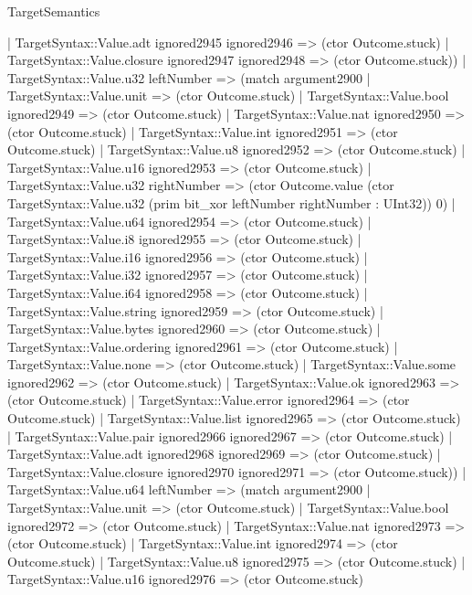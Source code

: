 \begin{lexlean}{TargetSemantics}
\begin{semanticmodule}
{              | TargetSyntax::Value.adt ignored2945 ignored2946 => (ctor Outcome.stuck)
              | TargetSyntax::Value.closure ignored2947 ignored2948 => (ctor Outcome.stuck))
            | TargetSyntax::Value.u32 leftNumber => (match argument2900
              | TargetSyntax::Value.unit => (ctor Outcome.stuck)
              | TargetSyntax::Value.bool ignored2949 => (ctor Outcome.stuck)
              | TargetSyntax::Value.nat ignored2950 => (ctor Outcome.stuck)
              | TargetSyntax::Value.int ignored2951 => (ctor Outcome.stuck)
              | TargetSyntax::Value.u8 ignored2952 => (ctor Outcome.stuck)
              | TargetSyntax::Value.u16 ignored2953 => (ctor Outcome.stuck)
              | TargetSyntax::Value.u32 rightNumber => (ctor Outcome.value (ctor TargetSyntax::Value.u32 (prim bit_xor leftNumber rightNumber : UInt32)) 0)
              | TargetSyntax::Value.u64 ignored2954 => (ctor Outcome.stuck)
              | TargetSyntax::Value.i8 ignored2955 => (ctor Outcome.stuck)
              | TargetSyntax::Value.i16 ignored2956 => (ctor Outcome.stuck)
              | TargetSyntax::Value.i32 ignored2957 => (ctor Outcome.stuck)
              | TargetSyntax::Value.i64 ignored2958 => (ctor Outcome.stuck)
              | TargetSyntax::Value.string ignored2959 => (ctor Outcome.stuck)
              | TargetSyntax::Value.bytes ignored2960 => (ctor Outcome.stuck)
              | TargetSyntax::Value.ordering ignored2961 => (ctor Outcome.stuck)
              | TargetSyntax::Value.none => (ctor Outcome.stuck)
              | TargetSyntax::Value.some ignored2962 => (ctor Outcome.stuck)
              | TargetSyntax::Value.ok ignored2963 => (ctor Outcome.stuck)
              | TargetSyntax::Value.error ignored2964 => (ctor Outcome.stuck)
              | TargetSyntax::Value.list ignored2965 => (ctor Outcome.stuck)
              | TargetSyntax::Value.pair ignored2966 ignored2967 => (ctor Outcome.stuck)
              | TargetSyntax::Value.adt ignored2968 ignored2969 => (ctor Outcome.stuck)
              | TargetSyntax::Value.closure ignored2970 ignored2971 => (ctor Outcome.stuck))
            | TargetSyntax::Value.u64 leftNumber => (match argument2900
              | TargetSyntax::Value.unit => (ctor Outcome.stuck)
              | TargetSyntax::Value.bool ignored2972 => (ctor Outcome.stuck)
              | TargetSyntax::Value.nat ignored2973 => (ctor Outcome.stuck)
              | TargetSyntax::Value.int ignored2974 => (ctor Outcome.stuck)
              | TargetSyntax::Value.u8 ignored2975 => (ctor Outcome.stuck)
              | TargetSyntax::Value.u16 ignored2976 => (ctor Outcome.stuck)
}
\end{semanticmodule}
\end{lexlean}
